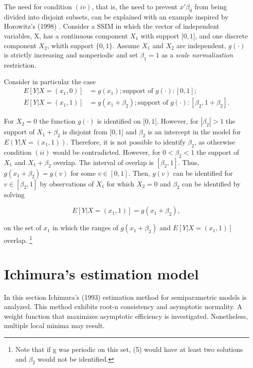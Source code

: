 \documentclass[a4paper]{article}
\begin{document}
The need for condition $(iv)$, that is,  the need to prevent $x'\beta_0$  from being divided into disjoint subsets, can be explained with an example inspired by Horowitz's (1998) \cite{[13]}. Consider a SSIM in which the vector of independent variables, X, has a continuous component $X_1$ with support $\big[0,1\big]$, and one discrete component $X_2$, whith support $\{0,1\}$. Assume $X_1$ and $X_2$ are independent, $g(\cdot)$ is strictly increasing and nonperiodic and set $\beta_1 = 1$ as a \textit{scale normalization} restriction. 

Consider in particular the case
\[
\begin{split}
E[Y| X = (x_1,0)]& = g(x_1); \text{support\ of } g(\cdot): [0,1];  \\
E[Y| X = (x_1,1)]& = g(x_1+\beta_2); \text{support\ of } g(\cdot): [\beta_2,1+\beta_2].
\end{split}
\]

For $X_2 = 0$ the function $g(\cdot)$ is identified on $\big[0,1\big]$. However, for $|\beta_2| > 1$ the support of $ X_1 + \beta_2$ is disjoint from $\big[0,1\big]$ and $\beta_2$ is an intercept in the model for $E(Y|X=(x_1,1))$. Therefore, it is not possible to identify $\beta_2$, as otherwise condition $(ii)$ would be contradicted. However, for $0<\beta_2 < 1$ the support of $X_1$ and $X_1 + \beta_2$ overlap. The interval of overlap is $[\beta_2, 1]$. Thus, $g(x_1 + \beta_2) = g(v)$ for some $v \in [0,1]$. Then, $g(v)$ can be identified for $v \in [\beta_2, 1]$ by observations of $X_1$ for which $X_2 = 0$ and $\beta_2$ can be identified by solving

\begin{equation}
E[Y| X = (x_1,1)] = g(x_1 + \beta_2),
\end{equation}

on the set of $x_1$ in which the ranges of $g(x_1 + \beta_2)$ and $E[Y| X = (x_1,1)]$ overlap. \footnote{Note that if g was periodic on this set, (5) would have at least two solutions and $\beta_2$ would not be identified.}


\section{Ichimura's estimation model} %
\label{sec:Ichimura's estimation model}

In this section Ichimura's (1993) \cite{[6]} estimation method for semiparametric models is analyzed. This method exhibits root-n consistency and asymptotic normality. A weight function that maximizes asymptotic efficiency is investigated. Nonetheless, multiple local minima may result. 
\end{document}
